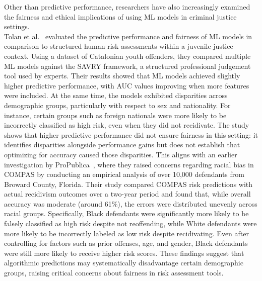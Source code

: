 \documentclass[12pt]{article}
\begin{document}
Other than predictive performance, researchers have also increasingly examined the fairness and ethical implications of using ML models in criminal justice settings.\\

Tolan et al.~\cite{tolan2019machine} evaluated the predictive performance and fairness of ML models in comparison to structured human risk assessments within a juvenile justice context. Using a dataset of Catalonian youth offenders, they compared multiple ML models against the SAVRY framework, a structured professional judgement tool used by experts. Their results showed that ML models achieved slightly higher predictive performance, with AUC values improving when more features were included. At the same time, the models exhibited disparities across demographic groups, particularly with respect to sex and nationality. For instance, certain groups such as foreign nationals were more likely to be incorrectly classified as high risk, even when they did not recidivate. The study shows that higher predictive performance did not ensure fairness in this setting: it identifies disparities alongside performance gains but does not establish that optimizing for accuracy caused those disparities. This aligns with an earlier investigation by ProPublica~\cite{propublica2016analysis}, where they raised concerns regarding racial bias in COMPAS by conducting an empirical analysis of over 10,000 defendants from Broward County, Florida. Their study compared COMPAS risk predictions with actual recidivism outcomes over a two-year period and found that, while overall accuracy was moderate (around 61\%), the errors were distributed unevenly across racial groups. Specifically, Black defendants were significantly more likely to be falsely classified as high risk despite not reoffending, while White defendants were more likely to be incorrectly labeled as low risk despite recidivating. Even after controlling for factors such as prior offenses, age, and gender, Black defendants were still more likely to receive higher risk scores. These findings suggest that algorithmic predictions may systematically disadvantage certain demographic groups, raising critical concerns about fairness in risk assessment tools.\\ 
\end{document}
